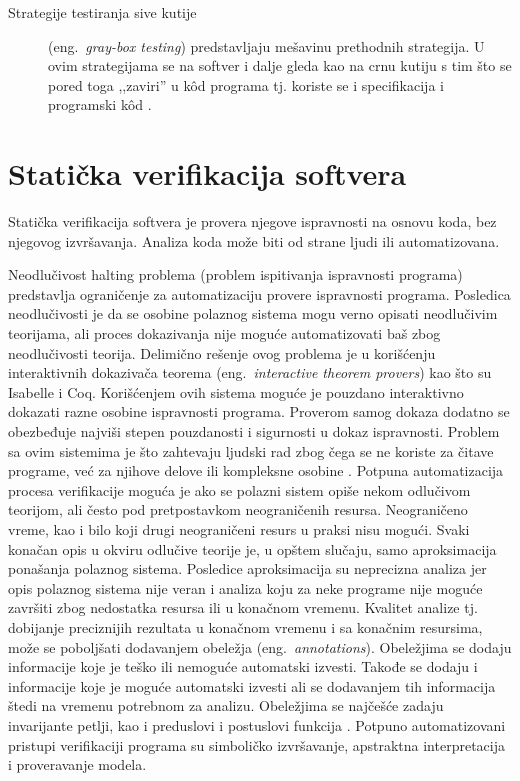 \documentclass[12pt,oneside]{memoir}
\begin{document}
\begin{description}
\item [Strategije testiranja sive kutije] (eng.~\textit{gray-box testing}) predstavljaju mešavinu prethodnih strategija. U ovim strategijama se na softver i dalje gleda kao na crnu kutiju s tim što se pored toga ,,zaviri'' u  k\^od programa tj. koriste se i specifikacija i programski k\^od \cite{mvj, SoftTest}.
\end{description}



\section{Statička verifikacija softvera}
Statička verifikacija softvera je provera njegove ispravnosti na osnovu koda, bez njegovog izvršavanja. Analiza koda može biti od strane ljudi ili automatizovana. 



Neodlučivost halting problema (problem ispitivanja ispravnosti programa) predstavlja ograničenje za automatizaciju provere ispravnosti programa. Posledica neodlučivosti je da se osobine polaznog sistema mogu verno opisati neodlučivim teorijama, ali proces dokazivanja nije moguće automatizovati baš zbog neodlučivosti teorija. Delimično rešenje ovog problema je u korišćenju interaktivnih dokazivača teorema (eng.~\textit{interactive theorem provers}) kao što su Isabelle i Coq. Korišćenjem ovih sistema moguće je pouzdano interaktivno dokazati razne osobine ispravnosti programa. Proverom samog dokaza dodatno se obezbeđuje najviši stepen pouzdanosti i sigurnosti u dokaz ispravnosti. Problem sa ovim sistemima je što zahtevaju ljudski rad zbog čega se ne koriste za čitave programe, već za njihove delove ili kompleksne osobine \cite{mvj}. 
Potpuna automatizacija procesa verifikacije moguća je ako se polazni sistem opiše nekom odlučivom teorijom, ali često pod pretpostavkom neograničenih resursa. Neograničeno vreme, kao i bilo koji drugi neograničeni resurs u praksi nisu mogući. Svaki konačan opis u okviru odlučive teorije je, u opštem slučaju, samo aproksimacija ponašanja polaznog sistema. Posledice aproksimacija su neprecizna analiza jer opis polaznog sistema nije veran i analiza koju za neke programe nije moguće završiti zbog nedostatka resursa ili u konačnom vremenu. 
Kvalitet analize tj. dobijanje preciznijih rezultata u konačnom vremenu i sa konačnim resursima, može se poboljšati dodavanjem obeležja (eng.~\textit{annotations}). Obeležjima se dodaju informacije koje je teško ili nemoguće automatski izvesti. Takođe se dodaju i informacije koje je moguće automatski izvesti ali se dodavanjem tih informacija štedi na vremenu potrebnom za analizu. Obeležjima se najčešće zadaju invarijante petlji, kao i preduslovi i postuslovi funkcija \cite{mvj}. 
Potpuno automatizovani pristupi verifikaciji programa su simboličko izvršavanje, apstraktna interpretacija i proveravanje modela. 
\end{document}
